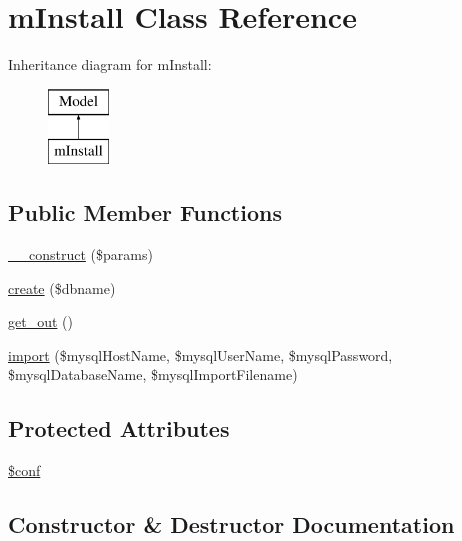\hypertarget{classmInstall}{}\section{m\+Install Class Reference}
\label{classmInstall}
Inheritance diagram for m\+Install\+:\begin{figure}[H]
\begin{center}
\leavevmode
\includegraphics[height=2.000000cm]{classmInstall}
\end{center}
\end{figure}
\subsection*{Public Member Functions}
\begin{DoxyCompactItemize}
\item 
\hyperlink{classmInstall_a229e5e04fbd8d1f65011b50b52a9befc}{\+\_\+\+\_\+construct} (\$params)
\item 
\hyperlink{classmInstall_acdaadb3239e705ac947c40f7c21b8217}{create} (\$dbname)
\item 
\hyperlink{classmInstall_a35b66150908fe450c5c965a2cf5a0834}{get\+\_\+out} ()
\item 
\hyperlink{classmInstall_ad960e44aba081537e16aa570446a12dc}{import} (\$mysql\+Host\+Name, \$mysql\+User\+Name, \$mysql\+Password, \$mysql\+Database\+Name, \$mysql\+Import\+Filename)
\end{DoxyCompactItemize}
\subsection*{Protected Attributes}
\begin{DoxyCompactItemize}
\item 
\hyperlink{classmInstall_adde2b54a22a6aaa56b40e5e4bdc0544e}{\$conf}
\end{DoxyCompactItemize}


\subsection{Constructor \& Destructor Documentation}
\hypertarget{classmInstall_a229e5e04fbd8d1f65011b50b52a9befc}{}
